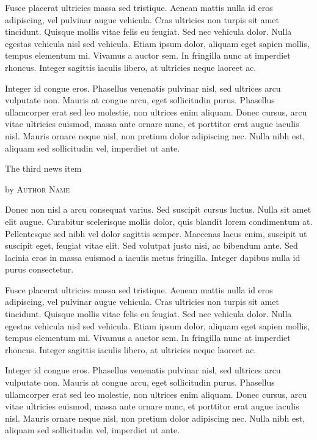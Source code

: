 \documentclass[10pt,a4paper]{article} %
\newcommand{\NewsItem}[1]{ %
    \usefont{T1}{fvs}{n}{n} %
    \vspace{24pt}\large #1\vspace{3pt} %
    \par \normalsize \normalfont}
\newcommand{\NewsAuthor}[1]{ %
    \hfill by \textsc{#1} \vspace{20pt} %
    \par \normalfont}
\begin{document}
\begin{multicols}{3} %

    Fusce placerat ultricies massa sed tristique. Aenean mattis nulla id eros
    adipiscing, vel pulvinar augue vehicula. Cras ultricies non turpis sit amet
    tincidunt. Quisque mollis vitae felis eu feugiat. Sed nec vehicula dolor. Nulla
    egestas vehicula nisl sed vehicula. Etiam ipsum dolor, aliquam eget sapien
    mollis, tempus elementum mi. Vivamus a auctor sem. In fringilla nunc at
    imperdiet rhoncus. Integer sagittis iaculis libero, at ultricies neque laoreet
    ac.

    Integer id congue eros. Phasellus venenatis pulvinar nisl, sed ultrices arcu
    vulputate non. Mauris at congue arcu, eget sollicitudin purus. Phasellus
    ullamcorper erat sed leo molestie, non ultrices enim aliquam. Donec cursus,
    arcu vitae ultricies euismod, massa ante ornare nunc, et porttitor erat augue
    iaculis nisl. Mauris ornare neque nisl, non pretium dolor adipiscing nec. Nulla
    nibh est, aliquam sed sollicitudin vel, imperdiet ut ante.


    \NewsItem{The third news item}
    \NewsAuthor{Author Name}

    Donec non nisl a arcu consequat varius. Sed suscipit cursus luctus. Nulla sit
    amet elit augue. Curabitur scelerisque mollis dolor, quis blandit lorem
    condimentum at. Pellentesque sed nibh vel dolor sagittis semper. Maecenas lacus
    enim, suscipit ut suscipit eget, feugiat vitae elit. Sed volutpat justo nisi,
    ac bibendum ante. Sed lacinia eros in massa euismod a iaculis metus fringilla.
    Integer dapibus nulla id purus consectetur.

    Fusce placerat ultricies massa sed tristique. Aenean mattis nulla id eros
    adipiscing, vel pulvinar augue vehicula. Cras ultricies non turpis sit amet
    tincidunt. Quisque mollis vitae felis eu feugiat. Sed nec vehicula dolor. Nulla
    egestas vehicula nisl sed vehicula. Etiam ipsum dolor, aliquam eget sapien
    mollis, tempus elementum mi. Vivamus a auctor sem. In fringilla nunc at
    imperdiet rhoncus. Integer sagittis iaculis libero, at ultricies neque laoreet
    ac.

    Integer id congue eros. Phasellus venenatis pulvinar nisl, sed ultrices arcu
    vulputate non. Mauris at congue arcu, eget sollicitudin purus. Phasellus
    ullamcorper erat sed leo molestie, non ultrices enim aliquam. Donec cursus,
    arcu vitae ultricies euismod, massa ante ornare nunc, et porttitor erat augue
    iaculis nisl. Mauris ornare neque nisl, non pretium dolor adipiscing nec. Nulla
    nibh est, aliquam sed sollicitudin vel, imperdiet ut ante.


\end{multicols}
\end{document}
